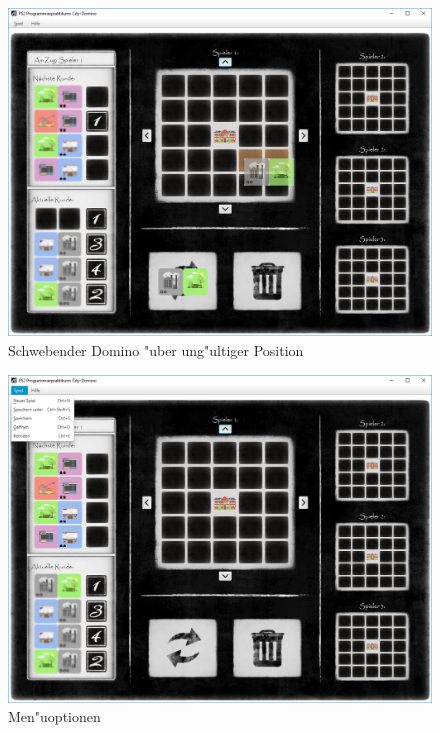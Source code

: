 \begin{figure}
	\centering
	\includegraphics{screenshots/screenshot_HovernRot}
	\caption{Schwebender Domino "uber ung"ultiger Position}
	\label{fig:hovernRot}
\end{figure}


\newpage

\begin{figure}
	\centering
	\includegraphics{screenshots/screenshot_Menue}
	\caption{Men"uoptionen}
	\label{fig:menueoptionen}
\end{figure}

